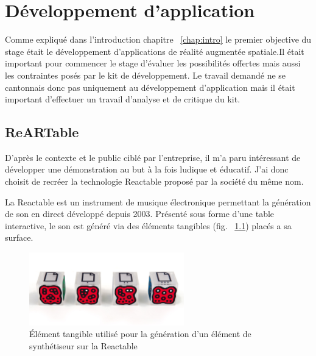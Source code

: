 \chapter{Développement d'application}

Comme expliqué dans l'introduction chapitre ~\ref{chap:intro} le premier objective du stage était le développement d'applications de réalité augmentée spatiale.Il était important pour commencer le stage d'évaluer les possibilités offertes mais aussi les contraintes posés par le kit de développement. Le travail demandé ne se cantonnais donc pas uniquement au développement d'application mais il était important d'effectuer un travail d'analyse et de critique du kit.

\section{ReARTable}
D'après le contexte et le public ciblé par l'entreprise, il m'a paru intéressant de développer une démonstration au but à la fois ludique et éducatif. J'ai donc choisit de recréer la technologie Reactable\cite{reactable} proposé par la société du même nom.

La Reactable est un instrument de musique électronique permettant la génération de son en direct développé depuis 2003. Présenté sous forme d'une table interactive, le son est généré via des éléments tangibles (fig. ~\ref{fig:reactelem}) placés a sa surface. 

\begin{figure}[H]
\centering
\includegraphics[width=0.6\textwidth]{images/reactelements}
\caption{Élément tangible utilisé pour la génération d'un élément de synthétiseur sur la Reactable\protect\footnotemark}
\label{fig:reactelem}
\end{figure}



